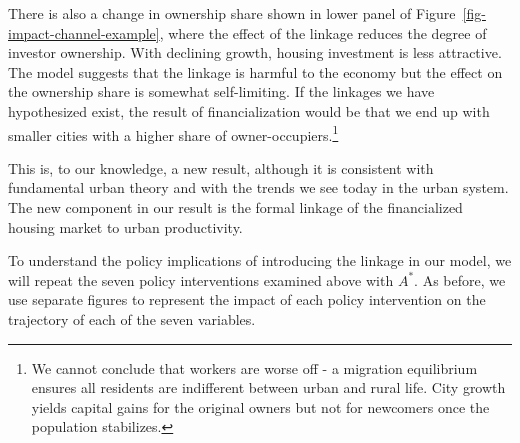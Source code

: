 There is also a change in ownership share shown in lower panel of Figure~\ref{fig-impact-channel-example}, where the effect of the linkage reduces the degree of investor ownership. With declining growth, housing investment is less attractive. The model suggests that the linkage is harmful to the economy but the effect on the ownership share is somewhat self-limiting.  If the linkages we have hypothesized exist, the result of financialization would be that we end up with smaller cities with a higher share of owner-occupiers.\footnote{We cannot conclude that workers are worse off -  a migration equilibrium ensures all residents are indifferent between urban and rural life. City growth yields capital gains for the original owners but not for newcomers once the population stabilizes.}




This is, to our knowledge, a new result, although it is consistent with fundamental urban theory and with the trends we see today in the urban system. The new component in our result is the formal linkage of the financialized housing market to urban productivity.




To understand the policy implications of introducing the linkage in our model, we will repeat the seven policy interventions examined above with  $A^*$.  As before, we use separate figures to represent the impact of each policy intervention on the trajectory of each of the seven variables. 




\newpage
